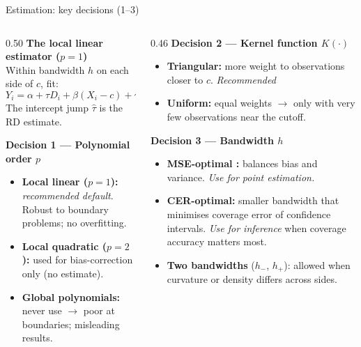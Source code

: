 \documentclass[aspectratio=169, 10pt]{beamer}
\begin{document}
\begin{frame}[shrink=5]{Estimation: key decisions (1--3) \citep{cattaneo2019}}

  \begin{columns}[T]
    \begin{column}{0.50\textwidth}
      \textbf{The local linear estimator ($p=1$)}\\[2pt]
      Within bandwidth $h$ on each side of $c$, fit:
      \[
        Y_i = \alpha + \tau D_i + \beta(X_i - c) + \gamma D_i(X_i - c) + \varepsilon_i
      \]
      The intercept jump $\hat\tau$ is the RD estimate.

      \smallskip
      \textbf{Decision 1 — Polynomial order $p$}
      \begin{itemize}
        \item \textbf{Local linear ($p=1$):} \emph{recommended default}.
              Robust to boundary problems; no overfitting.
        \item \textbf{Local quadratic ($p=2$):} used for
              bias-correction only (no estimate).
        \item \textbf{Global polynomials:} never use $\rightarrow$ poor at boundaries; misleading results.
      \end{itemize}
    \end{column}
    \begin{column}{0.46\textwidth}
      \textbf{Decision 2 — Kernel function $K(\cdot)$}
      \begin{itemize}
        \item \textbf{Triangular:} more weight
              to observations closer to $c$. \emph{Recommended}
        \item \textbf{Uniform:} equal weights $\rightarrow$ only with very few observations near the cutoff.
      \end{itemize}

      \smallskip
      \textbf{Decision 3 — Bandwidth $h$}
      \begin{itemize}
        \item \textbf{MSE-optimal \citep{calonico2014}:}
              balances bias and variance. \emph{Use for point
              estimation.}
        \item \textbf{CER-optimal:} smaller bandwidth that minimises
              coverage error of confidence intervals. \emph{Use for
              inference} when coverage accuracy matters most.
        \item \textbf{Two bandwidths} ($h_-$, $h_+$): allowed when
              curvature or density differs across sides.
      \end{itemize}
    \end{column}
  \end{columns}

\end{frame}
\end{document}
